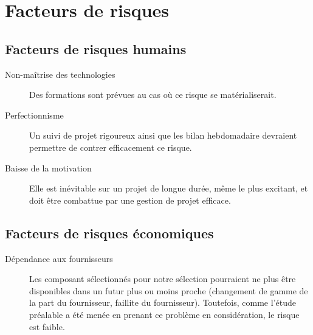 \section{Facteurs de risques}

\subsection{Facteurs de risques humains}

\begin{description}
\item[Non-maîtrise des technologies] Des formations sont prévues au cas où
ce risque se matérialiserait.
\item[Perfectionnisme] Un suivi de projet rigoureux ainsi que les bilan
hebdomadaire devraient permettre de contrer efficacement ce risque.
\item[Baisse de la motivation] Elle est inévitable sur un projet de longue
durée, même le plus excitant, et doit être combattue par une gestion de
projet efficace.
\end{description}

\subsection{Facteurs de risques économiques}

\begin{description}
\item[Dépendance aux fournisseurs] Les composant sélectionnés pour notre
sélection pourraient ne plus être disponibles dans un futur plus ou moins
proche (changement de gamme de la part du fournisseur, faillite du
fournisseur). Toutefois, comme l'étude préalable a été menée en prenant ce
problème en considération, le risque est faible.
\end{description}
